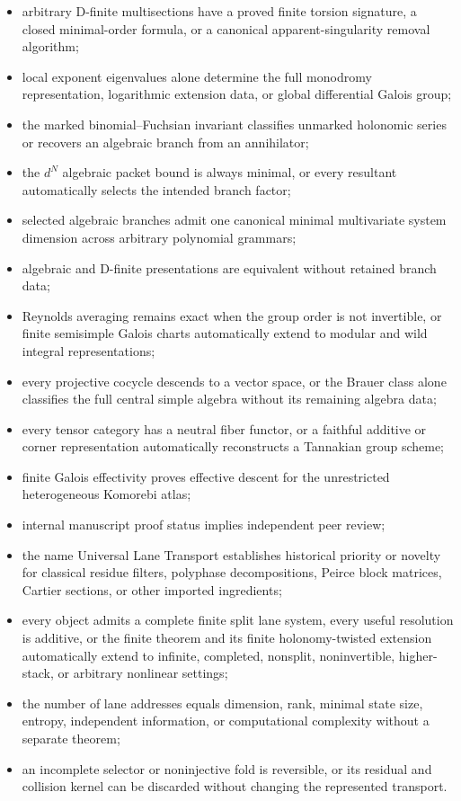 \begin{itemize}
\item arbitrary D-finite multisections have a proved finite torsion signature, a closed minimal-order formula, or a canonical apparent-singularity removal algorithm;
\item local exponent eigenvalues alone determine the full monodromy representation, logarithmic extension data, or global differential Galois group;
\item the marked binomial--Fuchsian invariant classifies unmarked holonomic series or recovers an algebraic branch from an annihilator;
\item the $d^N$ algebraic packet bound is always minimal, or every resultant automatically selects the intended branch factor;
\item selected algebraic branches admit one canonical minimal multivariate system dimension across arbitrary polynomial grammars;
\item algebraic and D-finite presentations are equivalent without retained branch data;
\item Reynolds averaging remains exact when the group order is not invertible, or finite semisimple Galois charts automatically extend to modular and wild integral representations;
\item every projective cocycle descends to a vector space, or the Brauer class alone classifies the full central simple algebra without its remaining algebra data;
\item every tensor category has a neutral fiber functor, or a faithful additive or corner representation automatically reconstructs a Tannakian group scheme;
\item finite Galois effectivity proves effective descent for the unrestricted heterogeneous Komorebi atlas;
\item internal manuscript proof status implies independent peer review;
\item the name Universal Lane Transport establishes historical priority or novelty for classical residue filters, polyphase decompositions, Peirce block matrices, Cartier sections, or other imported ingredients;
\item every object admits a complete finite split lane system, every useful resolution is additive, or the finite theorem and its finite holonomy-twisted extension automatically extend to infinite, completed, nonsplit, noninvertible, higher-stack, or arbitrary nonlinear settings;
\item the number of lane addresses equals dimension, rank, minimal state size, entropy, independent information, or computational complexity without a separate theorem;
\item an incomplete selector or noninjective fold is reversible, or its residual and collision kernel can be discarded without changing the represented transport.
\end{itemize}

